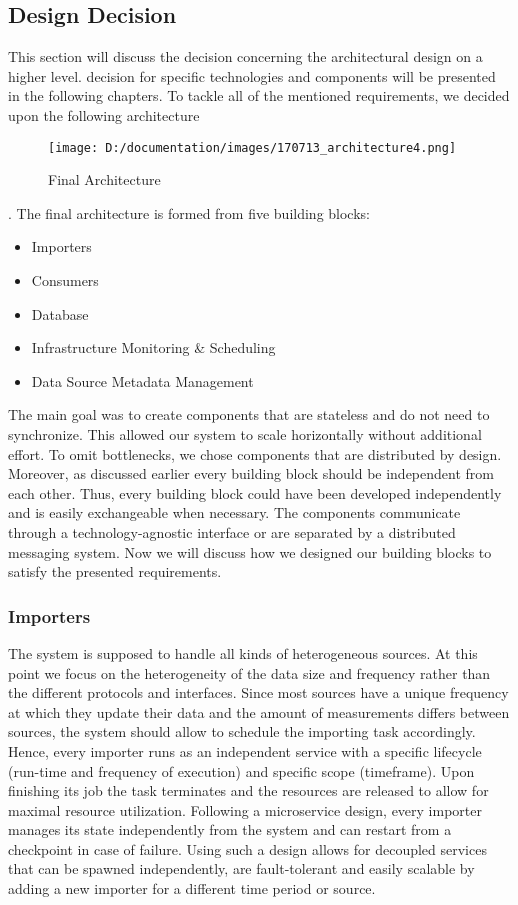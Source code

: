 \subsection{Design Decision}\label{design-decision}

This section will discuss the decision concerning the architectural
design on a higher level. decision for specific technologies and
components will be presented in the following chapters. To tackle all of
the mentioned requirements, we decided upon the following architecture
\begin{figure}
	\centering
		\texttt{[image: D:/documentation/images/170713\_architecture4.png]}
	\caption{Final Architecture}
	\label{fig:170713_architecture4}
\end{figure}
. The final architecture is formed from five
building blocks:

\begin{itemize}
\tightlist
\item
  Importers
\item
  Consumers
\item
  Database
\item
  Infrastructure Monitoring \& Scheduling
\item
  Data Source Metadata Management
\end{itemize}

The main goal was to create components that are stateless and do not
need to synchronize. This allowed our system to scale horizontally
without additional effort. To omit bottlenecks, we chose components that
are distributed by design. Moreover, as discussed earlier every building
block should be independent from each other. Thus, every building block
could have been developed independently and is easily exchangeable when
necessary. The components communicate through a technology-agnostic
interface or are separated by a distributed messaging system. Now we
will discuss how we designed our building blocks to satisfy the
presented requirements.

\subsubsection{Importers}\label{importers}

The system is supposed to handle all kinds of heterogeneous sources. At
this point we focus on the heterogeneity of the data size and frequency
rather than the different protocols and interfaces. Since most sources
have a unique frequency at which they update their data and the amount
of measurements differs between sources, the system should allow to
schedule the importing task accordingly. Hence, every importer runs as
an independent service with a specific lifecycle (run-time and frequency
of execution) and specific scope (timeframe). Upon finishing its job the
task terminates and the resources are released to allow for maximal
resource utilization. Following a microservice design, every importer
manages its state independently from the system and can restart from a
checkpoint in case of failure. Using such a design allows for decoupled
services that can be spawned independently, are fault-tolerant and
easily scalable by adding a new importer for a different time period or
source.

